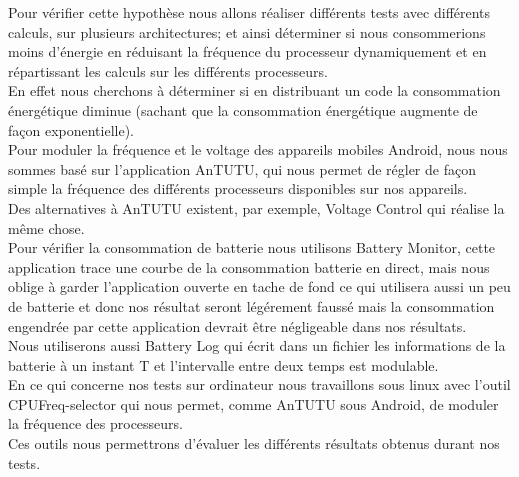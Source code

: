 	Pour vérifier cette hypothèse nous allons réaliser différents tests avec différents calculs, sur plusieurs architectures; et ainsi déterminer si nous consommerions moins d'énergie en réduisant la fréquence du processeur dynamiquement et en répartissant les calculs sur les différents processeurs.\\

	En effet nous cherchons à déterminer si en distribuant un code la consommation énergétique diminue (sachant que la consommation énergétique augmente de façon exponentielle).\\

	Pour moduler la fréquence et le voltage des appareils mobiles Android, nous nous sommes basé sur l'application AnTUTU\footnotemark[4]{}, qui nous permet de régler de façon simple la fréquence des différents processeurs disponibles sur nos appareils.\\

	Des alternatives à AnTUTU existent, par exemple, Voltage Control\footnotemark[5]{} qui réalise la même chose. \\

	Pour vérifier la consommation de batterie nous utilisons Battery Monitor\footnotemark[6]{}, cette application trace une courbe de la consommation batterie en direct, mais nous oblige à garder l'application ouverte en tache de fond ce qui utilisera aussi un peu de batterie et donc nos résultat seront légérement faussé mais la consommation engendrée par cette application devrait être négligeable dans nos résultats. \\

	Nous utiliserons aussi Battery Log\footnotemark[7]{} qui écrit dans un fichier les informations de la batterie à un instant T et l'intervalle entre deux temps est modulable.\\

	En ce qui concerne nos tests sur ordinateur nous travaillons sous linux avec l'outil CPUFreq-selector\footnotemark[8]{} qui nous permet, comme AnTUTU sous Android, de moduler la fréquence des processeurs.\\

	Ces outils nous permettrons d'évaluer les différents résultats obtenus durant nos tests.

